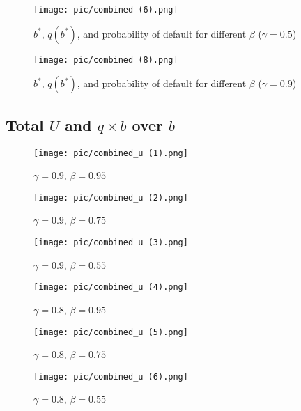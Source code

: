 \documentclass{article}
\begin{document}
\begin{figure}[H]
\centering
{\texttt{[image: pic/combined (6).png]}}
\caption{$b^*$, $q(b^*)$, and probability of default for different $\beta$ ($\gamma = 0.5$)}
\end{figure}

\begin{figure}[H]
\centering
{\texttt{[image: pic/combined (8).png]}}
\caption{$b^*$, $q(b^*)$, and probability of default for different $\beta$ ($\gamma = 0.9$)}
\end{figure}

\newpage
\subsection{Total $U$ and $q \times b$ over $b$}

\begin{figure}[H]
\centering
{\texttt{[image: pic/combined\_u (1).png]}}
\caption{$\gamma = 0.9$, $\beta = 0.95$}
\end{figure}

\begin{figure}[H]
\centering
{\texttt{[image: pic/combined\_u (2).png]}}
\caption{$\gamma = 0.9$, $\beta = 0.75$}
\end{figure}

\begin{figure}[H]
\centering
{\texttt{[image: pic/combined\_u (3).png]}}
\caption{$\gamma = 0.9$, $\beta = 0.55$}
\end{figure}

\begin{figure}[H]
\centering
{\texttt{[image: pic/combined\_u (4).png]}}
\caption{$\gamma = 0.8$, $\beta = 0.95$}
\end{figure}

\begin{figure}[H]
\centering
{\texttt{[image: pic/combined\_u (5).png]}}
\caption{$\gamma = 0.8$, $\beta = 0.75$}
\end{figure}

\begin{figure}[H]
\centering
{\texttt{[image: pic/combined\_u (6).png]}}
\caption{$\gamma = 0.8$, $\beta = 0.55$}
\end{figure}
\end{document}
